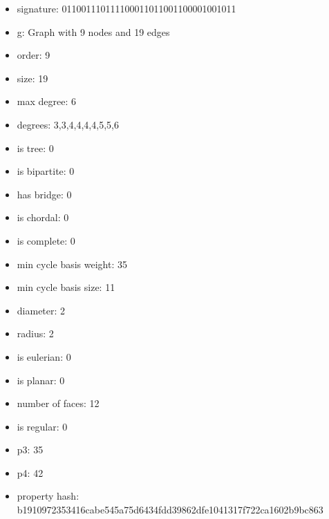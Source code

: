 \newpage
\begin{figure}
\end{figure}
\begin{itemize}
\item signature: 011001110111100011011001100001001011
\item g: Graph with 9 nodes and 19 edges
\item order: 9
\item size: 19
\item max degree: 6
\item degrees: 3,3,4,4,4,4,5,5,6
\item is tree: 0
\item is bipartite: 0
\item has bridge: 0
\item is chordal: 0
\item is complete: 0
\item min cycle basis weight: 35
\item min cycle basis size: 11
\item diameter: 2
\item radius: 2
\item is eulerian: 0
\item is planar: 0
\item number of faces: 12
\item is regular: 0
\item p3: 35
\item p4: 42
\item property hash: b1910972353416cabe545a75d6434fdd39862dfe1041317f722ca1602b9bc863
\end{itemize}
